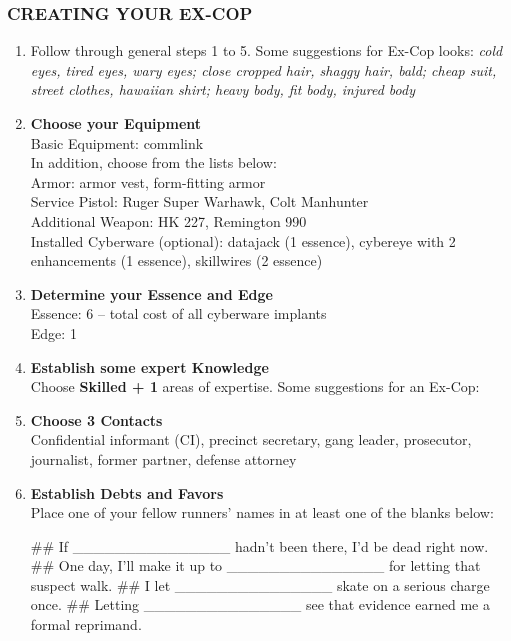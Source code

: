 \subsubsection{CREATING YOUR EX-COP}
\begin{enumerate}
    \item Follow through general steps 1 to 5. Some suggestions for Ex-Cop looks: \textit{cold eyes, tired eyes, wary eyes; close cropped hair, shaggy hair, bald; cheap suit, street clothes, hawaiian shirt; heavy body, fit body, injured body}
    
    \item \textbf{Choose your Equipment} \\
    Basic Equipment: commlink \\
    In addition, choose from the lists below: \\
        Armor: armor vest, form-fitting armor \\
        Service Pistol: Ruger Super Warhawk, Colt Manhunter \\
        Additional Weapon: HK 227, Remington 990 \\
        Installed Cyberware (optional): datajack (1 essence), cybereye with 2 enhancements (1 essence), skillwires (2 essence)
    
    \item \textbf{Determine your Essence and Edge} \\
    Essence: 6 – total cost of all cyberware implants \\
    Edge: 1

    \item \textbf{Establish some expert Knowledge} \\
    Choose \textbf{\textsf{Skilled + 1}} areas of expertise. Some suggestions for an Ex-Cop: \textit{}
    
    \item \textbf{Choose 3 Contacts} \\
    Confidential informant (CI), precinct secretary, gang leader, prosecutor, journalist, former partner, defense attorney
    
    \item \textbf{Establish Debts and Favors} \\
    Place one of your fellow runners’ names in at least one of the blanks below:
        \begin{easylist}
            ## If \_\_\_\_\_\_\_\_\_\_\_\_\_\_\_ hadn’t been there, I’d be dead right now.
            ## One day, I’ll make it up to \_\_\_\_\_\_\_\_\_\_\_\_\_\_\_ for letting that suspect walk.
            ## I let \_\_\_\_\_\_\_\_\_\_\_\_\_\_\_ skate on a serious charge once.
            ## Letting \_\_\_\_\_\_\_\_\_\_\_\_\_\_\_ see that evidence earned me a formal reprimand.
        \end{easylist}
    

\end{enumerate}
